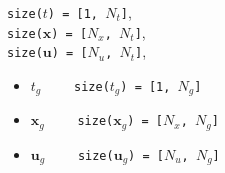 \texttt{size($t$) = [1, $N_t$]}, \\
\texttt{size($\bm{x}$) = [$N_x$, $N_t$]}, \\
\texttt{size($\bm{u}$) = [$N_u$, $N_t$]}, \\

\begin{itemize} \setlength\itemsep{-0.1em}
\item {}\tc{ = }$t_g \qquad$ \texttt{size($t_g$) = [1, $N_g$]}   
\item {}\tc{ = }$\bm{x}_g \qquad$ \texttt{size($\bm{x}_g$) = [$N_x$, $N_g$]}  
\item {}\tc{ = }$\bm{u}_g \qquad$ \texttt{size($\bm{u}_g$) = [$N_u$, $N_g$]}
\end{itemize}
